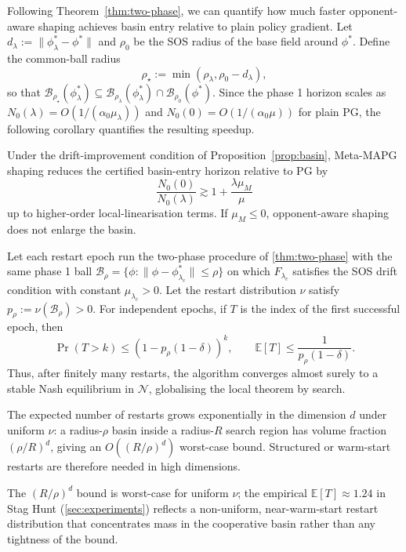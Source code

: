 \documentclass{nextgame2026} %
\newcommand{\E}{\mathbb{E}}
\newcommand{\B}{\mathcal{B}}
\newcommand{\N}{\mathcal{N}}
\begin{document}
Following Theorem~\ref{thm:two-phase}, we can quantify how much faster 
opponent-aware shaping achieves basin entry relative to plain policy 
gradient. Let $d_\lambda := \|\phi^*_\lambda - \phi^*\|$ and $\rho_0$ be 
the SOS radius of the base field around $\phi^*$. Define the common-ball 
radius
\[
\rho_\star := \min(\rho_\lambda, \rho_0 - d_\lambda),
\]
so that $\B_{\rho_\star}(\phi^*_\lambda) \subseteq \B_{\rho_\lambda}
(\phi^*_\lambda) \cap \B_{\rho_0}(\phi^*)$. Since the phase 1 horizon 
scales as $N_0(\lambda) = O(1/(\alpha_0\mu_\lambda))$ and $N_0(0) = 
O(1/(\alpha_0\mu))$ for plain PG, the following corollary quantifies the 
resulting speedup.

\begin{corollary}\label{cor:speedup}
Under the drift-improvement condition of Proposition~\ref{prop:basin}, 
Meta-MAPG shaping reduces the certified basin-entry horizon relative to PG by
\[
\frac{N_0(0)}{N_0(\lambda)} \gtrsim 1 + \frac{\lambda\mu_M}{\mu}
\]
up to higher-order local-linearisation terms. If $\mu_M \le 0$, 
opponent-aware shaping does not enlarge the basin.
\end{corollary}


\begin{theorem}\label{thm:restart}
Let each restart epoch run the two-phase procedure of \cref{thm:two-phase} with the same phase 1 ball $\B_\rho=\{\phi:\|\phi-\phi^\ast_{\lambda_c}\|\le\rho\}$ on which $F_{\lambda_c}$ satisfies the SOS drift condition with constant $\mu_{\lambda_c}>0$. Let the restart distribution $\nu$ satisfy $p_\rho:=\nu(\B_\rho)>0$. For independent epochs, if $T$ is the index of the first successful epoch, then
\[
\Pr(T>k)\le (1-p_\rho(1-\delta))^k,\qquad
\E[T]\le \frac{1}{p_\rho(1-\delta)}.
\]
Thus, after finitely many restarts, the algorithm converges almost surely 
to a stable Nash equilibrium in $\N$, globalising the local theorem by search.
\end{theorem}

The expected number of restarts grows exponentially in the dimension $d$ 
under uniform $\nu$: a radius-$\rho$ basin inside a radius-$R$ search 
region has volume fraction $(\rho/R)^d$, giving an $O((R/\rho)^d)$ 
worst-case bound. Structured or warm-start restarts are therefore needed 
in high dimensions.

\begin{remark}\label{rem:restart-empirics}
The $(R/\rho)^d$ bound is worst-case for uniform $\nu$; the empirical $\E[T]\approx 1.24$ in Stag Hunt (\cref{sec:experiments}) reflects a non-uniform, near-warm-start restart distribution that concentrates mass in the cooperative basin rather than any tightness of the bound.
\end{remark}
\end{document}
